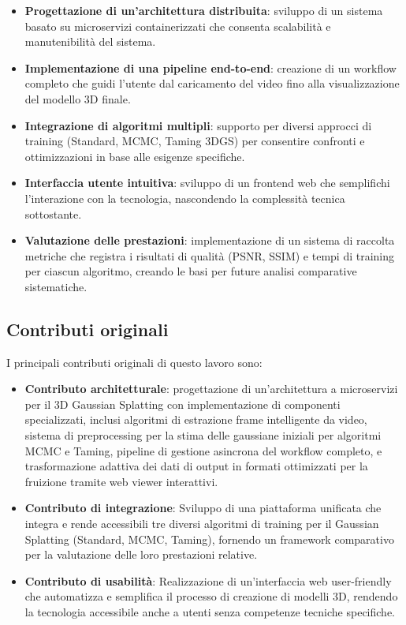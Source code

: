 \begin{itemize}
    \item \textbf{Progettazione di un'architettura distribuita}: sviluppo di un sistema basato su microservizi containerizzati che consenta scalabilità e manutenibilità del sistema.
    \item \textbf{Implementazione di una pipeline end-to-end}: creazione di un workflow completo che guidi l'utente dal caricamento del video fino alla visualizzazione del modello 3D finale.
    \item \textbf{Integrazione di algoritmi multipli}: supporto per diversi approcci di training (Standard, MCMC, Taming 3DGS) per consentire confronti e ottimizzazioni in base alle esigenze specifiche.
    \item \textbf{Interfaccia utente intuitiva}: sviluppo di un frontend web che semplifichi l'interazione con la tecnologia, nascondendo la complessità tecnica sottostante.
    \item \textbf{Valutazione delle prestazioni}: implementazione di un sistema di raccolta metriche che registra i risultati di qualità (PSNR, SSIM) e tempi di training per ciascun algoritmo, creando le basi per future analisi comparative sistematiche.
\end{itemize}

\subsection*{Contributi originali}
I principali contributi originali di questo lavoro sono:
\begin{itemize}
\item \textbf{Contributo architetturale}: progettazione di un'architettura a microservizi per il 3D Gaussian Splatting con implementazione di componenti specializzati, inclusi algoritmi di estrazione frame intelligente da video, sistema di preprocessing per la stima delle gaussiane iniziali per algoritmi MCMC e Taming, pipeline di gestione asincrona del workflow completo, e trasformazione adattiva dei dati di output in formati ottimizzati per la fruizione tramite web viewer interattivi.
\item \textbf{Contributo di integrazione}: Sviluppo di una piattaforma unificata che integra e rende accessibili tre diversi algoritmi di training per il Gaussian Splatting (Standard, MCMC, Taming), fornendo un framework comparativo per la valutazione delle loro prestazioni relative.
\item \textbf{Contributo di usabilità}: Realizzazione di un'interfaccia web user-friendly che automatizza e semplifica il processo di creazione di modelli 3D, rendendo la tecnologia accessibile anche a utenti senza competenze tecniche specifiche.
\end{itemize}

